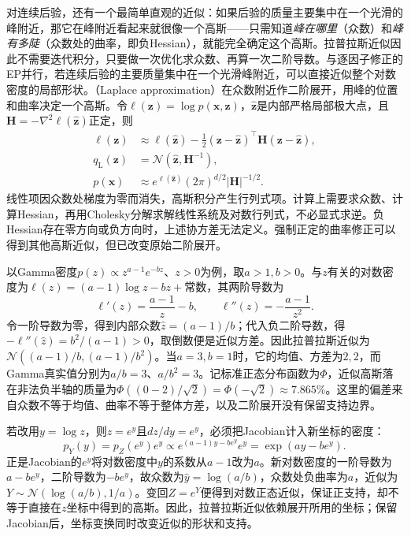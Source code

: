 对连续后验，还有一个最简单直观的近似：如果后验的质量主要集中在一个光滑的峰附近，那它在峰附近看起来就很像一个高斯——只需知道\emph{峰在哪里}（众数）和\emph{峰有多陡}（众数处的曲率，即负Hessian），就能完全确定这个高斯。拉普拉斯近似因此不需要迭代积分，只要做一次优化求众数、再算一次二阶导数。与逐因子修正的EP并行，若连续后验的主要质量集中在一个光滑峰附近，可以直接近似整个对数密度的局部形状。（Laplace approximation）在众数附近作二阶展开，用峰的位置和曲率决定一个高斯。令$\ell(\bm z)=\log p(\bm x,\bm z)$，$\widehat{\bm z}$是内部严格局部极大点，且$\bm H=-\nabla^2\ell(\widehat{\bm z})$正定，则
\begin{equation}
  \begin{aligned}
    \ell(\bm z)&\approx\ell(\widehat{\bm z})
       -\frac12(\bm z-\widehat{\bm z})^\top
                  \bm H(\bm z-\widehat{\bm z}),\\
    q_{\mathrm L}(\bm z)&=\mathcal N(\widehat{\bm z},\bm H^{-1}),\\
    p(\bm x)&\approx
       e^{\ell(\widehat{\bm z})}(2\pi)^{d/2}|\bm H|^{-1/2}.
  \end{aligned}
  \label{eq:pgm-variational-laplace}
\end{equation}
线性项因众数处梯度为零而消失，高斯积分产生行列式项。计算上需要求众数、计算Hessian，再用Cholesky分解求解线性系统及对数行列式，不必显式求逆。负Hessian存在零方向或负方向时，上述协方差无法定义。强制正定的曲率修正可以得到其他高斯近似，但已改变原始二阶展开。

以Gamma密度$p(z)\propto z^{a-1}e^{-bz}$、$z>0$为例，取$a>1,b>0$。与$z$有关的对数密度为$\ell(z)=(a-1)\log z-bz+\text{常数}$，其两阶导数为
\[
  \ell'(z)=\frac{a-1}{z}-b,\qquad
  \ell''(z)=-\frac{a-1}{z^2}.
\]
令一阶导数为零，得到内部众数$\widehat z=(a-1)/b$；代入负二阶导数，得$-\ell''(\widehat z)=b^2/(a-1)>0$，取倒数便是近似方差。因此拉普拉斯近似为$\mathcal N((a-1)/b,(a-1)/b^2)$。当$a=3,b=1$时，它的均值、方差为$2,2$，而Gamma真实值分别为$a/b=3$、$a/b^2=3$。记标准正态分布函数为$\Phi$，近似高斯落在非法负半轴的质量为$\Phi((0-2)/\sqrt2)=\Phi(-\sqrt2)\approx7.865\%$。这里的偏差来自众数不等于均值、曲率不等于整体方差，以及二阶展开没有保留支持边界。

若改用$y=\log z$，则$z=e^y$且$dz/dy=e^y$，必须把Jacobian计入新坐标的密度：
\[
  p_Y(y)=p_Z(e^y)e^y
       \propto e^{(a-1)y-be^y}e^y
       =\exp(ay-be^y).
\]
正是Jacobian的$e^y$将对数密度中$y$的系数从$a-1$改为$a$。新对数密度的一阶导数为$a-be^y$，二阶导数为$-be^y$，故众数为$\widehat y=\log(a/b)$，众数处负曲率为$a$，近似为$Y\sim\mathcal N(\log(a/b),1/a)$。变回$Z=e^Y$便得到对数正态近似，保证正支持，却不等于直接在$z$坐标中得到的高斯。因此，拉普拉斯近似依赖展开所用的坐标；保留Jacobian后，坐标变换同时改变近似的形状和支持。


